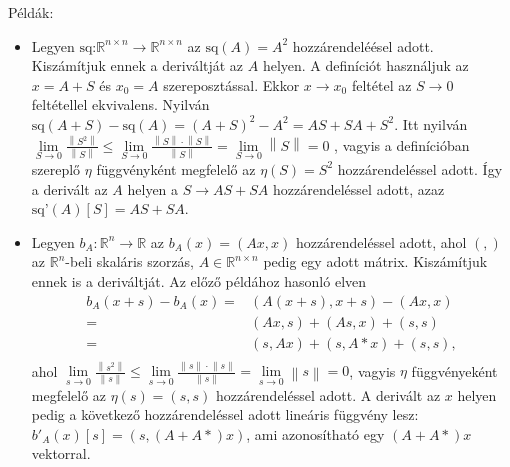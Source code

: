 \documentclass[12pt,a4paper]{scrartcl}
\providecommand{\tightlist}{%
  \setlength{\itemsep}{0pt}\setlength{\parskip}{0pt}}
\newenvironment{pelda}{}{}
\begin{document}
\begin{pelda}

Példák:

\begin{itemize}
\tightlist
\item
  Legyen
  \(\left. \text{sq:}{\mathbb{R}}^{n \times n}\rightarrow{\mathbb{R}}^{n \times n} \right.\)
  az \(\text{sq}\left( A \right) = A^{2}\) hozzárendeléésel adott.
  Kiszámítjuk ennek a deriváltját az \(A\) helyen. A definíciót
  használjuk az \(x = A + S\) és \(x_{0} = A\) szereposztással. Ekkor
  \(\left. x\rightarrow x_{0} \right.\) feltétel az
  \(\left. S\rightarrow 0 \right.\) feltétellel ekvivalens. Nyilván
  \(\text{sq}\left( {A + S} \right) - \text{sq}\left( A \right) = \left( {A + S} \right)^{2} - A^{2} = AS + SA + S^{2}.\)
  Itt nyilván
  \(\lim\limits_{S\rightarrow 0}\frac{\left\| S^{2} \right\|}{\left\| S \right\|} \leq \lim\limits_{S\rightarrow 0}\frac{\left\| S \right\| \cdot \left\| S \right\|}{\left\| S \right\|} = \lim\limits_{S\rightarrow 0}\left\| S \right\| = 0\)
  , vagyis a definícióban szereplő \(\eta\) függvényként megfelelő az
  \(\eta\left( S \right) = S^{2}\) hozzárendeléssel adott. Így a
  derivált az \(A\) helyen a \(\left. S\rightarrow AS + SA \right.\)
  hozzárendeléssel adott, azaz
  \(\text{sq'}\left( A \right)\left\lbrack S \right\rbrack = AS + SA\).
\item
  Legyen
  \(\left. b_{A}:{\mathbb{R}}^{n}\rightarrow{\mathbb{R}} \right.\) az
  \(b_{A}\left( x \right) = \left( {Ax,x} \right)\) hozzárendeléssel
  adott, ahol \(\left( {,} \right)\) az \({\mathbb{R}}^{n}\)-beli
  skaláris szorzás, \(A \in {\mathbb{R}}^{n \times n}\) pedig egy adott
  mátrix. Kiszámítjuk ennek is a deriváltját. Az előző példához hasonló
  elven \[\begin{aligned}
    {b_A}\left( {x + s} \right) - {b_A}\left( x \right) =  & \left( {A\left( {x + s} \right),x + s} \right) - \left( {Ax,x} \right) \\ 
     =  & \left( {Ax,s} \right) + \left( {As,x} \right) + \left( {s,s} \right) \\ 
     =  & \left( {s,Ax} \right) + \left( {s,A * x} \right) + \left( {s,s} \right), \\ 
  \end{aligned} \] ahol
  \(\lim\limits_{s\rightarrow 0}\frac{\left\| s^{2} \right\|}{\left\| s \right\|} \leq \lim\limits_{s\rightarrow 0}\frac{\left\| s \right\| \cdot \left\| s \right\|}{\left\| s \right\|} = \lim\limits_{s\rightarrow 0}\left\| s \right\| = 0\),
  vagyis \(\eta\) függvényeként megfelelő az
  \(\eta\left( s \right) = \left( {s,s} \right)\) hozzárendeléssel
  adott. A derivált az \(x\) helyen pedig a következő hozzárendeléssel
  adott lineáris függvény lesz:
  \(b'_{A}\left( x \right)\left\lbrack s \right\rbrack = \left( {s,\left( {A + A \ast} \right)x} \right)\),
  ami azonosítható egy \(\left( {A + A \ast} \right)x\) vektorral.
\end{itemize}

\end{pelda}
\end{document}

